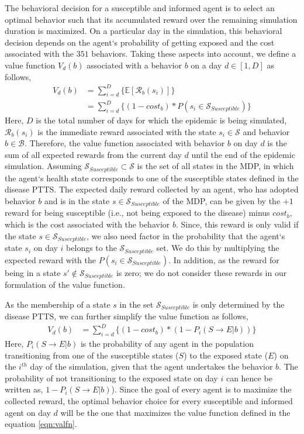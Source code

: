 \documentclass[doublespace]{VTthesis}
\begin{document}
    The behavioral decision for a susceptible and informed agent is to select an optimal behavior such that its accumulated reward over the remaining simulation duration is maximized. On a particular day in the simulation, this behavioral decision depends on the agent`s probability of getting exposed and the cost associated with the $351$ behaviors. Taking these aspects into account, we define a value function $V_d(b)$ associated with a behavior $b$ on a day $d \in [1,D]$ as follows,
    \begin{align*}
    V_d(b) &= \sum_{i=d}^D \bigg\{ \mathbb{E} [\mathcal{R}_b(s_i)] \bigg\}  \\
        &= \sum_{i=d}^D \bigg\{ (1 - cost_b) * P(s_i \in \mathcal{S}_{Susceptible}) \bigg\} 
    \end{align*}
    Here, $D$ is the total number of days for which the epidemic is being simulated, $\mathcal{R}_b(s_i)$ is the immediate reward associated with the state $s_i \in \mathcal{S}$ and behavior $b \in \mathcal{B}$. Therefore, the value function associated with behavior $b$ on day $d$ is the sum of all expected rewards from the current day $d$ until the end of the epidemic simulation. Assuming $\mathcal{S}_{Susceptible} \subset \mathcal{S}$ is the set of all states in the MDP, in which the agent`s health state corresponds to one of the susceptible states defined in the disease PTTS. The expected daily reward collected by an agent, who has adopted behavior $b$ and is in the state $s \in \mathcal{S}_{Susceptible}$ of the MDP, can be given by the $+1$ reward for being susceptible (i.e., not being exposed to the disease) minus $cost_b$, which is the cost associated with the behavior $b$. Since, this reward is only valid if the state $s \in \mathcal{S}_{Susceptible}$, we also need factor in the probability that the agent`s state $s_i$ on day $i$ belongs to the $\mathcal{S}_{Susceptible}$ set. We do this by multiplying the expected reward with the $P(s_i \in \mathcal{S}_{Susceptible})$. In addition, as the reward for being in a state $s' \notin \mathcal{S}_{Susceptible}$ is zero; we do not consider these rewards in our formulation of the value function. 
    
    As the membership of a state $s$ in the set $\mathcal{S}_{Susceptible}$ is only determined by the disease PTTS, we can further simplify the value function as follows,
    \begin{align}
    V_d(b) &= \sum_{i=d}^D \bigg\{ (1-cost_b) * (1 - P_i(S \rightarrow E|b)) \bigg\} 
    \label{eqn:valfn}
    \end{align}
    Here, $P_i(S \rightarrow E|b)$ is the probability of any agent in the population transitioning from one of the susceptible states ($S$) to the exposed state ($E$) on the $i^{th}$ day of the simulation, given that the agent undertakes the behavior $b$. The probability of not transitioning to the exposed state on day $i$ can hence be written as, $1 - P_i(S \rightarrow E|b)$). Since the goal of every agent is to maximize the collected reward, the optimal behavior choice for every susceptible and informed agent on day $d$ will be the one that maximizes the value function defined in the equation \ref{eqn:valfn}. 
    
\end{document}
